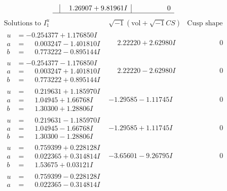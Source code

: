\documentclass[1p]{elsarticle_modified}
\theoremstyle{definition}
\newcommand{\I}{\sqrt{-1}}
\begin{document}
$$\begin{array}{c|c|c}
 & \phantom{-}1.26907 + 9.81961 I & \phantom{-0.000000 } 0\\
 \hline 
 \end{array}$$\newpage$$\begin{array}{c|c|c}  
\text{Solutions to }I^u_{1}& \I (\text{vol} + \sqrt{-1}CS) & \text{Cusp shape}\\
 \hline 
\begin{aligned}
u &= -0.254377 + 1.176850 I \\
a &= \phantom{-}0.003247 - 1.401810 I \\
b &= \phantom{-}0.773222 - 0.895144 I\end{aligned}
 & \phantom{-}2.22220 + 2.62980 I & \phantom{-0.000000 } 0 \\ \hline\begin{aligned}
u &= -0.254377 - 1.176850 I \\
a &= \phantom{-}0.003247 + 1.401810 I \\
b &= \phantom{-}0.773222 + 0.895144 I\end{aligned}
 & \phantom{-}2.22220 - 2.62980 I & \phantom{-0.000000 } 0 \\ \hline\begin{aligned}
u &= \phantom{-}0.219631 + 1.185970 I \\
a &= \phantom{-}1.04945 + 1.66768 I \\
b &= \phantom{-}1.30300 + 1.28806 I\end{aligned}
 & -1.29585 - 1.11745 I & \phantom{-0.000000 } 0 \\ \hline\begin{aligned}
u &= \phantom{-}0.219631 - 1.185970 I \\
a &= \phantom{-}1.04945 - 1.66768 I \\
b &= \phantom{-}1.30300 - 1.28806 I\end{aligned}
 & -1.29585 + 1.11745 I & \phantom{-0.000000 } 0 \\ \hline\begin{aligned}
u &= \phantom{-}0.759399 + 0.228128 I \\
a &= \phantom{-}0.022365 + 0.314814 I \\
b &= \phantom{-}1.53675 + 0.03121 I\end{aligned}
 & -3.65601 - 9.26795 I & \phantom{-0.000000 } 0 \\ \hline\begin{aligned}
u &= \phantom{-}0.759399 - 0.228128 I \\
a &= \phantom{-}0.022365 - 0.314814 I \\

\end{aligned}
\end{array}$$
\end{document}

